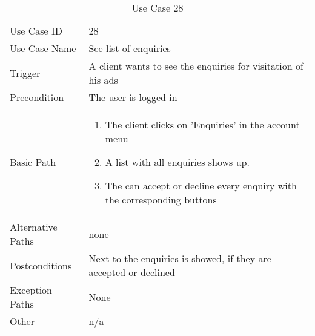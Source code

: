 \begin{table}[H]
\centering
\label{table-use-case-28}
\begin{tabular}{|p{3cm}|p{10cm}}
Use Case ID       & 28                                                         
\\
Use Case Name     & See list of enquiries                                                         
\\
Trigger           & A client wants to see the enquiries for visitation of his ads
\\
Precondition      & The user is logged in                                                
\\
Basic Path        & \begin{enumerate}
\item The client clicks on 'Enquiries' in the account menu
\item A list with all enquiries shows up.
\item The can accept or decline every enquiry with the corresponding buttons
\end{enumerate} 
     \\
Alternative Paths & none                     
\\
Postconditions    & Next to the enquiries is showed, if they are accepted or declined
\\
Exception Paths   & None                          \\
Other             & n/a                                                                                                                                                                                                        
\end{tabular}
\caption{Use Case 28}
\end{table}


